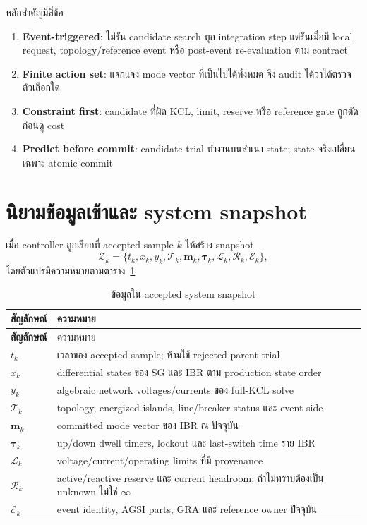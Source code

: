 \documentclass[12pt,a4paper]{article}
\begin{document}
หลักสำคัญมีสี่ข้อ
\begin{enumerate}
  \item \textbf{Event-triggered}: ไม่รัน candidate search ทุก integration step แต่รันเมื่อมี local request,
  topology/reference event หรือ post-event re-evaluation ตาม contract
  \item \textbf{Finite action set}: แจกแจง mode vector ที่เป็นไปได้ทั้งหมด จึง audit ได้ว่าได้ตรวจตัวเลือกใด
  \item \textbf{Constraint first}: candidate ที่ผิด KCL, limit, reserve หรือ reference gate ถูกตัดก่อนดู cost
  \item \textbf{Predict before commit}: candidate trial ทำงานบนสำเนา state; state จริงเปลี่ยนเฉพาะ atomic commit
\end{enumerate}

\section{นิยามข้อมูลเข้าและ system snapshot}

เมื่อ controller ถูกเรียกที่ accepted sample $k$ ให้สร้าง snapshot
\begin{equation}
\mathcal Z_k=\{t_k,x_k,y_k,\mathcal T_k,\mathbf m_k,\boldsymbol\tau_k,
\mathcal L_k,\mathcal R_k,\mathcal E_k\},
\end{equation}
โดยตัวแปรมีความหมายตามตาราง~\ref{tab:snapshot}

\begin{longtable}{>{\bfseries}p{}p{}}
\caption{ข้อมูลใน accepted system snapshot}\label{tab:snapshot}\\
\toprule
สัญลักษณ์ & ความหมาย \\
\midrule\endfirsthead
\toprule สัญลักษณ์ & ความหมาย \\
\midrule\endhead
$t_k$ & เวลาของ accepted sample; ห้ามใช้ rejected parent trial \\
$x_k$ & differential states ของ SG และ IBR ตาม production state order \\
$y_k$ & algebraic network voltages/currents ของ full-KCL solve \\
$\mathcal T_k$ & topology, energized islands, line/breaker status และ event side \\
$\mathbf m_k$ & committed mode vector ของ IBR ณ ปัจจุบัน \\
$\boldsymbol\tau_k$ & up/down dwell timers, lockout และ last-switch time ราย IBR \\
$\mathcal L_k$ & voltage/current/operating limits ที่มี provenance \\
$\mathcal R_k$ & active/reactive reserve และ current headroom; ถ้าไม่ทราบต้องเป็น unknown ไม่ใช่ $\infty$ \\
$\mathcal E_k$ & event identity, AGSI parts, GRA และ reference owner ปัจจุบัน \\
\bottomrule
\end{longtable}
\end{document}
